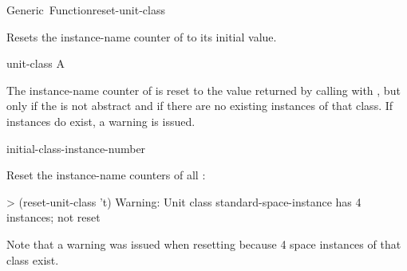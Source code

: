 \documentclass[10pt,twoside,english,pdftex]{article}
\begin{document}
\begin{functiondoc}{Generic~Function}{reset-unit-class}%
  {}

\fnsyntax

\fnpurpose Resets the  instance-name counter of
 to its initial value.

\fnmethods
{}%
  {\code{(} }
%
  {\code{(} }
%
  {\code{(} }

\fnpackage {}

\fnmodule {}

\fnargs
\begin{args}{unit-class}
 A 
\end{args}

\fndescription The  instance-name counter of
 is reset to the value returned by calling
\textbf{} with , but
only if the  is not abstract and if there are no existing
instances of that class.  If instances do exist, a warning is issued.

\begin{alsos}{initial-class-instance-number}
\end{alsos}

\fnexample Reset the instance-name counters of all :
%
\W\supp
\begin{example}
> (reset-unit-class 't)
Warning: Unit class standard-space-instance has 4 instances; not reset
\end{example}
%
Note that a warning was issued when resetting
\textbf{} because 4 space instances of
that class exist.

\end{functiondoc}

\end{document}
